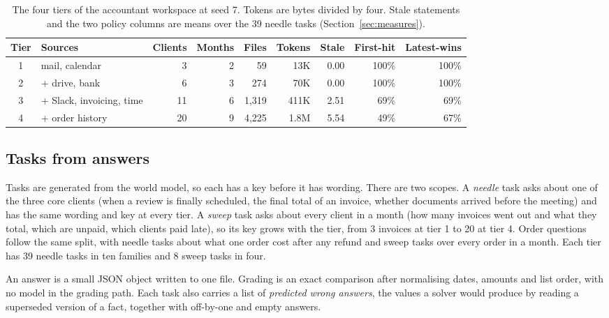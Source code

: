 \documentclass{article}
\begin{document}
\begin{table}[t]
  \caption{The four tiers of the accountant workspace at seed 7. Tokens are bytes divided by four. Stale statements and the two policy columns are means over the 39 needle tasks (Section~\ref{sec:measures}).}
  \label{tab:tiers}
  \centering
  \small
  \setlength{\tabcolsep}{4pt}
  \begin{tabular}{@{}clrrrrrrr@{}}
    \toprule
    Tier & Sources & Clients & Months & Files & Tokens & Stale & First-hit & Latest-wins \\
    \midrule
    1 & mail, calendar            & 3  & 2 & 59      & 13K   & 0.00 & 100\% & 100\% \\
    2 & + drive, bank             & 6  & 3 & 274     & 70K   & 0.00 & 100\% & 100\% \\
    3 & + Slack, invoicing, time  & 11 & 6 & 1{,}319 & 411K  & 2.51 & 69\%  & 69\%  \\
    4 & + order history           & 20 & 9 & 4{,}225 & 1.8M  & 5.54 & 49\%  & 67\%  \\
    \bottomrule
  \end{tabular}
\end{table}

\subsection{Tasks from answers}

Tasks are generated from the world model, so each has a key before it has wording. There are two scopes. A \emph{needle} task asks about one of the three core clients (when a review is finally scheduled, the final total of an invoice, whether documents arrived before the meeting) and has the same wording and key at every tier. A \emph{sweep} task asks about every client in a month (how many invoices went out and what they total, which are unpaid, which clients paid late), so its key grows with the tier, from 3 invoices at tier 1 to 20 at tier 4. Order questions follow the same split, with needle tasks about what one order cost after any refund and sweep tasks over every order in a month. Each tier has 39 needle tasks in ten families and 8 sweep tasks in four.

An answer is a small JSON object written to one file. Grading is an exact comparison after normalising dates, amounts and list order, with no model in the grading path. Each task also carries a list of \emph{predicted wrong answers}, the values a solver would produce by reading a superseded version of a fact, together with off-by-one and empty answers.
\end{document}
